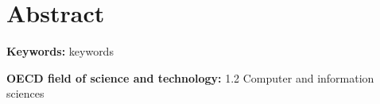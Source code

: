 \section*{Abstract}
\lipsum[5]

\vspace{1cm}
\noindent
\textbf{Keywords:} keywords


\vspace{1cm}
\noindent
\textbf{OECD field of science and technology:} 1.2 Computer and information sciences
